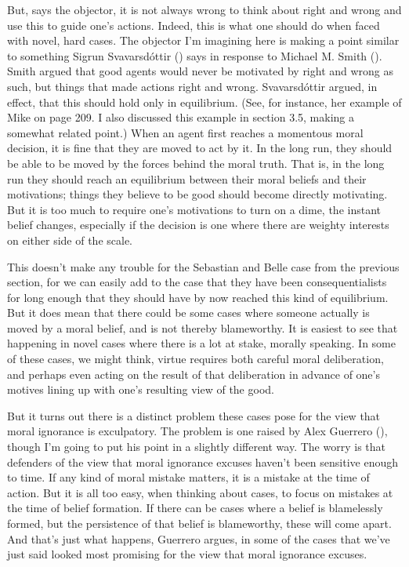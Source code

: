 \documentclass[
  10pt,
  letterpaper,
  twoside]{scrbook}
\begin{document}
But, says the objector, it is not always wrong to think about right and
wrong and use this to guide one's actions. Indeed, this is what one
should do when faced with novel, hard cases. The objector I'm imagining
here is making a point similar to something Sigrun Svavarsdóttir
() says in response to Michael M.
Smith (). Smith argued that good agents
would never be motivated by right and wrong as such, but things that
made actions right and wrong. Svavarsdóttir argued, in effect, that this
should hold only in equilibrium. (See, for instance, her example of Mike
on page 209. I also discussed this example in section 3.5, making a
somewhat related point.) When an agent first reaches a momentous moral
decision, it is fine that they are moved to act by it. In the long run,
they should be able to be moved by the forces behind the moral truth.
That is, in the long run they should reach an equilibrium between their
moral beliefs and their motivations; things they believe to be good
should become directly motivating. But it is too much to require one's
motivations to turn on a dime, the instant belief changes, especially if
the decision is one where there are weighty interests on either side of
the scale.

This doesn't make any trouble for the {Sebastian} and {Belle} case from
the previous section, for we can easily add to the case that they have
been consequentialists for long enough that they should have by now
reached this kind of equilibrium. But it does mean that there could be
some cases where someone actually is moved by a moral belief, and is not
thereby blameworthy. It is easiest to see that happening in novel cases
where there is a lot at stake, morally speaking. In some of these cases,
we might think, virtue requires both careful moral deliberation, and
perhaps even acting on the result of that deliberation in advance of
one's motives lining up with one's resulting view of the good.

But it turns out there is a distinct problem these cases pose for the
view that moral ignorance is exculpatory. The problem is one raised by
Alex Guerrero (), though I'm going to
put his point in a slightly different way. The worry is that defenders
of the view that moral ignorance excuses haven't been sensitive enough
to time. If any kind of moral mistake matters, it is a mistake at the
time of action. But it is all too easy, when thinking about cases, to
focus on mistakes at the time of belief formation. If there can be cases
where a belief is blamelessly formed, but the persistence of that belief
is blameworthy, these will come apart. And that's just what happens,
Guerrero argues, in some of the cases that we've just said looked most
promising for the view that moral ignorance excuses.
\end{document}
